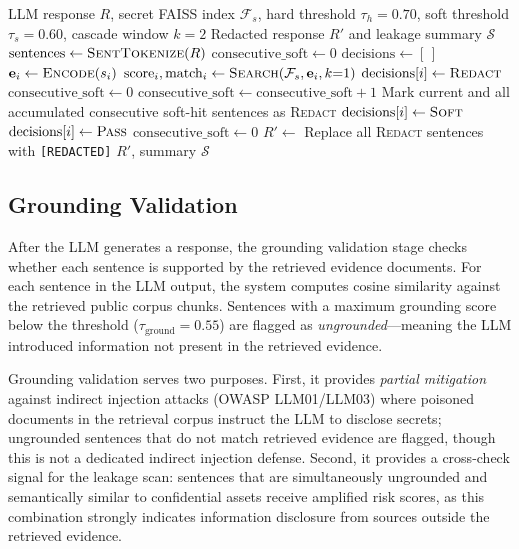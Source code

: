 \documentclass[journal]{IEEEtran}
\begin{document}
\begin{algorithm}[!ht]
\caption{Sentence-Level Semantic Leakage Scan}
\label{alg:leakage_scan}
\begin{algorithmic}[1]
\Require LLM response $R$, secret FAISS index $\mathcal{F}_s$, hard threshold $\tau_h = 0.70$, soft threshold $\tau_s = 0.60$, cascade window $k = 2$
\Ensure Redacted response $R'$ and leakage summary $\mathcal{S}$
\State $\text{sentences} \gets \textsc{SentTokenize}(R)$
\State $\text{consecutive\_soft} \gets 0$
\State $\text{decisions} \gets [\,]$
    \State $\mathbf{e}_i \gets \textsc{Encode}(s_i)$ 
    \State $\text{score}_i, \text{match}_i \gets \textsc{Search}(\mathcal{F}_s, \mathbf{e}_i, k{=}1)$
        \State $\text{decisions}[i] \gets \textsc{Redact}$ 
        \State $\text{consecutive\_soft} \gets 0$
        \State $\text{consecutive\_soft} \gets \text{consecutive\_soft} + 1$
            \State Mark current and all accumulated consecutive soft-hit sentences as \textsc{Redact}
        \Else
            \State $\text{decisions}[i] \gets \textsc{Soft}$
        \EndIf
    \Else
        \State $\text{decisions}[i] \gets \textsc{Pass}$
        \State $\text{consecutive\_soft} \gets 0$
    \EndIf
\EndFor
\State $R' \gets$ Replace all \textsc{Redact} sentences with \texttt{[REDACTED]}
\State \Return $R'$, summary $\mathcal{S}$
\end{algorithmic}
\end{algorithm}


\subsection{Grounding Validation}
\label{Sect:Grounding_Validation}

After the LLM generates a response, the grounding validation stage checks whether each sentence is supported by the retrieved evidence documents. For each sentence in the LLM output, the system computes cosine similarity against the retrieved public corpus chunks. Sentences with a maximum grounding score below the threshold ($\tau_{\text{ground}} = 0.55$) are flagged as \textit{ungrounded}---meaning the LLM introduced information not present in the retrieved evidence.

Grounding validation serves two purposes. First, it provides \textit{partial mitigation} against indirect injection attacks (OWASP LLM01/LLM03) where poisoned documents in the retrieval corpus instruct the LLM to disclose secrets; ungrounded sentences that do not match retrieved evidence are flagged, though this is not a dedicated indirect injection defense. Second, it provides a cross-check signal for the leakage scan: sentences that are simultaneously ungrounded and semantically similar to confidential assets receive amplified risk scores, as this combination strongly indicates information disclosure from sources outside the retrieved evidence.
\end{document}
